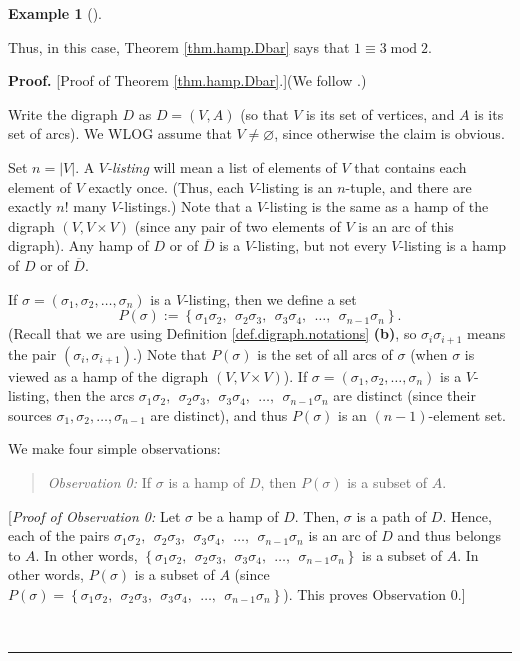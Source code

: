 \documentclass[numbers=enddot,12pt,final,onecolumn,notitlepage]{scrartcl}%
\numberwithin{exer}{subsection}
\theoremstyle{definition}
\newtheorem{exam}[theo]{Example}
\newenvironment{example}[1][]
{\begin{exam}[#1]\begin{leftbar}}
{\end{leftbar}\end{exam}}
\newenvironment{statement}{\begin{quote}}{\end{quote}}
\newenvironment{proof}[1][Proof]{\noindent\textbf{#1.} }{\ \rule{0.5em}{0.5em}}
\begin{document}
\begin{example}
Thus, in this case, Theorem \ref{thm.hamp.Dbar} says that $1\equiv
3\operatorname{mod}2$.
\end{example}

\begin{proof}
[Proof of Theorem \ref{thm.hamp.Dbar}.](We follow \cite[\S 10.1, Theorem
1]{Berge91}.)

Write the digraph $D$ as $D=\left(  V,A\right)  $ (so that $V$ is its set of
vertices, and $A$ is its set of arcs). We WLOG assume that $V\neq\varnothing$,
since otherwise the claim is obvious.

Set $n=\left\vert V\right\vert $. A $V$\emph{-listing} will mean a list of
elements of $V$ that contains each element of $V$ exactly once. (Thus, each
$V$-listing is an $n$-tuple, and there are exactly $n!$ many $V$-listings.)
Note that a $V$-listing is the same as a hamp of the digraph $\left(
V,V\times V\right)  $ (since any pair of two elements of $V$ is an arc of this
digraph). Any hamp of $D$ or of $\overline{D}$ is a $V$-listing, but not every
$V$-listing is a hamp of $D$ or of $\overline{D}$.

If $\sigma=\left(  \sigma_{1},\sigma_{2},\ldots,\sigma_{n}\right)  $ is a
$V$-listing, then we define a set%
\[
P\left(  \sigma\right)  :=\left\{  \sigma_{1}\sigma_{2},\ \ \sigma_{2}%
\sigma_{3},\ \ \sigma_{3}\sigma_{4},\ \ \ldots,\ \ \sigma_{n-1}\sigma
_{n}\right\}  .
\]
(Recall that we are using Definition \ref{def.digraph.notations} \textbf{(b)},
so $\sigma_{i}\sigma_{i+1}$ means the pair $\left(  \sigma_{i},\sigma
_{i+1}\right)  $.) Note that $P\left(  \sigma\right)  $ is the set of all arcs
of $\sigma$ (when $\sigma$ is viewed as a hamp of the digraph $\left(
V,V\times V\right)  $). If $\sigma=\left(  \sigma_{1},\sigma_{2},\ldots
,\sigma_{n}\right)  $ is a $V$-listing, then the arcs \newline$\sigma
_{1}\sigma_{2},\ \ \sigma_{2}\sigma_{3},\ \ \sigma_{3}\sigma_{4}%
,\ \ \ldots,\ \ \sigma_{n-1}\sigma_{n}$ are distinct (since their sources
$\sigma_{1},\sigma_{2},\ldots,\sigma_{n-1}$ are distinct), and thus $P\left(
\sigma\right)  $ is an $\left(  n-1\right)  $-element set.

We make four simple observations:

\begin{statement}
\textit{Observation 0:} If $\sigma$ is a hamp of $D$, then $P\left(
\sigma\right)  $ is a subset of $A$.
\end{statement}

[\textit{Proof of Observation 0:} Let $\sigma$ be a hamp of $D$. Then,
$\sigma$ is a path of $D$. Hence, each of the pairs $\sigma_{1}\sigma
_{2},\ \ \sigma_{2}\sigma_{3},\ \ \sigma_{3}\sigma_{4},\ \ \ldots
,\ \ \sigma_{n-1}\sigma_{n}$ is an arc of $D$ and thus belongs to $A$. In
other words, $\left\{  \sigma_{1}\sigma_{2},\ \ \sigma_{2}\sigma
_{3},\ \ \sigma_{3}\sigma_{4},\ \ \ldots,\ \ \sigma_{n-1}\sigma_{n}\right\}  $
is a subset of $A$. In other words, $P\left(  \sigma\right)  $ is a subset of
$A$ (since $P\left(  \sigma\right)  =\left\{  \sigma_{1}\sigma_{2}%
,\ \ \sigma_{2}\sigma_{3},\ \ \sigma_{3}\sigma_{4},\ \ \ldots,\ \ \sigma
_{n-1}\sigma_{n}\right\}  $). This proves Observation 0.]


\end{proof}
\end{document}
